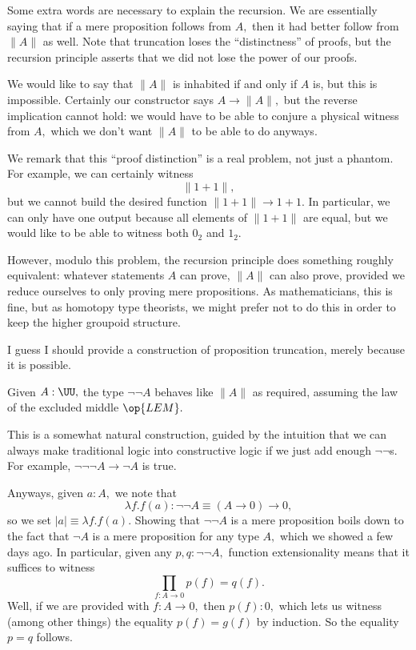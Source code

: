 Some extra words are necessary to explain the recursion. We are essentially saying that if a mere proposition follows from $A,$ then it had better follow from $\lVert A\rVert$ as well. Note that truncation loses the ``distinctness'' of proofs, but the recursion principle asserts that we did not lose the power of our proofs.

We would like to say that $\lVert A\rVert$ is inhabited if and only if $A$ is, but this is impossible. Certainly our constructor says $A\to\lVert A\rVert,$ but the reverse implication cannot hold: we would have to be able to conjure a physical witness from $A,$ which we don't want $\lVert A\rVert$ to be able to do anyways.

We remark that this ``proof distinction'' is a real problem, not just a phantom. For example, we can certainly witness
\[\lVert1+1\rVert,\]
but we cannot build the desired function $\lVert1+1\rVert\to1+1.$ In particular, we can only have one output because all elements of $\lVert1+1\rVert$ are equal, but we would like to be able to witness both $0_2$ and $1_2.$

However, modulo this problem, the recursion principle does something roughly equivalent: whatever statements $A$ can prove, $\lVert A\rVert$ can also prove, provided we reduce ourselves to only proving mere propositions. As mathematicians, this is fine, but as homotopy type theorists, we might prefer not to do this in order to keep the higher groupoid structure.

I guess I should provide a construction of proposition truncation, merely because it is possible.
\begin{proposition}
    Given $A:\UU,$ the type $\lnot\lnot A$ behaves like $\lVert A\rVert$ as required, assuming the law of the excluded middle $\op{LEM}.$
\end{proposition}
This is a somewhat natural construction, guided by the intuition that we can always make traditional logic into constructive logic if we just add enough $\lnot\lnot$s. For example, $\lnot\lnot\lnot A\to\lnot A$ is true.

Anyways, given $a:A,$ we note that
\[\lambda f.f(a):\lnot\lnot A\equiv(A\to 0)\to 0,\]
so we set $|a|\equiv\lambda f.f(a).$ Showing that $\lnot\lnot A$ is a mere proposition boils down to the fact that $\lnot A$ is a mere proposition for any type $A,$ which we showed a few days ago. In particular, given any $p,q:\lnot\lnot A,$ function extensionality means that it suffices to witness
\[\prod_{f:A\to0}p(f)=q(f).\]
Well, if we are provided with $f:A\to0,$ then $p(f):0,$ which lets us witness (among other things) the equality $p(f)=g(f)$ by induction. So the equality $p=q$ follows.

